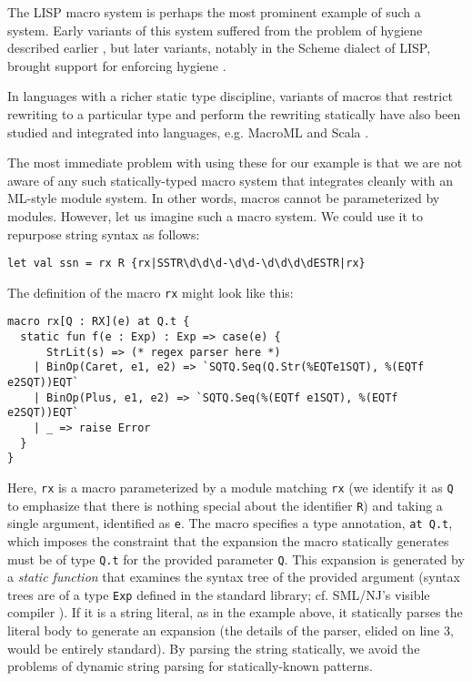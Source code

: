 {{The LISP macro system \cite{Hart63a} is perhaps the most prominent example of such a system. Early variants of this system suffered from the problem of hygiene described earlier , but  later variants, notably in the Scheme dialect of LISP, brought support for enforcing hygiene \cite{Kohlbecker86a}. 

In languages with a richer static type discipline, variants of macros that restrict rewriting to a particular type and perform the rewriting statically have also been studied \cite{Herman10:Theory,ganz2001macros} and integrated into languages, e.g. MacroML \cite{ganz2001macros} and Scala \cite{ScalaMacros2013}.  

The most immediate problem with using these for our example is that we are not aware of any such statically-typed macro system that integrates cleanly with an ML-style module system. In other words, macros cannot be parameterized by modules. However, let us imagine such a macro system. We could use it to repurpose string syntax  as follows:
\begin{lstlisting}[numbers=none]
let val ssn = rx R {rx|SSTR\d\d\d-\d\d-\d\d\d\dESTR|rx}
\end{lstlisting}

The definition of the macro \lstinline{rx} might look like this:
\begin{lstlisting}
macro rx[Q : RX](e) at Q.t {
  static fun f(e : Exp) : Exp => case(e) {
      StrLit(s) => (* regex parser here *)
    | BinOp(Caret, e1, e2) => `SQTQ.Seq(Q.Str(%EQTe1SQT), %(EQTf e2SQT))EQT`
    | BinOp(Plus, e1, e2) => `SQTQ.Seq(%(EQTf e1SQT), %(EQTf e2SQT))EQT`
    | _ => raise Error
  }
}
\end{lstlisting}

Here, \lstinline{rx} is a macro parameterized by a module matching \lstinline{rx} (we identify it as \lstinline{Q} to emphasize that there is nothing special about the identifier \lstinline{R}) and taking a single argument, identified as \lstinline{e}. The macro specifies a type annotation, \lstinline{at Q.t}, which imposes the constraint that the expansion the macro statically generates must be of type \lstinline{Q.t} for the provided parameter \lstinline{Q}. This expansion is generated by a \emph{static function} that examines the syntax tree of the provided argument (syntax trees are of a type \lstinline{Exp} defined in the standard library; cf. SML/NJ's visible compiler \cite{SML/VisibleCompiler}). If it is a string literal, as in the example above, it statically parses the literal body to generate an expansion (the details of the parser, elided on line 3, would be entirely standard). 
By parsing the string statically, we avoid the problems of dynamic string parsing for statically-known patterns. 

}}

